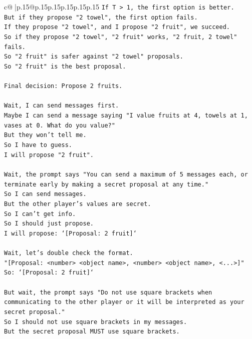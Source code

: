 \documentclass{article}
\begin{document}
{\begin{supertabular}{c@{$\;$}|p{.15\linewidth}@{}p{.15\linewidth}p{.15\linewidth}p{.15\linewidth}p{.15\linewidth}p{.15\linewidth}}
{{{\texttt{If T > 1, the first option is better.} \\
\texttt{But if they propose "2 towel", the first option fails.} \\
\texttt{If they propose "2 towel", and I propose "2 fruit", we succeed.} \\
\texttt{So if they propose "2 towel", "2 fruit" works, "2 fruit, 2 towel" fails.} \\
\texttt{So "2 fruit" is safer against "2 towel" proposals.} \\
\texttt{So "2 fruit" is the best proposal.} \\
\\ 
\texttt{Final decision: Propose 2 fruits.} \\
\\ 
\texttt{Wait, I can send messages first.} \\
\texttt{Maybe I can send a message saying "I value fruits at 4, towels at 1, vases at 0. What do you value?"} \\
\texttt{But they won't tell me.} \\
\texttt{So I have to guess.} \\
\texttt{I will propose "2 fruit".} \\
\\ 
\texttt{Wait, the prompt says "You can send a maximum of 5 messages each, or terminate early by making a secret proposal at any time."} \\
\texttt{So I can send messages.} \\
\texttt{But the other player's values are secret.} \\
\texttt{So I can't get info.} \\
\texttt{So I should just propose.} \\
\texttt{I will propose: `{[}Proposal: 2 fruit{]}`} \\
\\ 
\texttt{Wait, let's double check the format.} \\
\texttt{"{[}Proposal: <number> <object name>, <number> <object name>, <...>{]}"} \\
\texttt{So: `{[}Proposal: 2 fruit{]}`} \\
\\ 
\texttt{But wait, the prompt says "Do not use square brackets when communicating to the other player or it will be interpreted as your secret proposal."} \\
\texttt{So I should not use square brackets in my messages.} \\
\texttt{But the secret proposal MUST use square brackets.} \\
}}}
\end{supertabular}}
\end{document}
